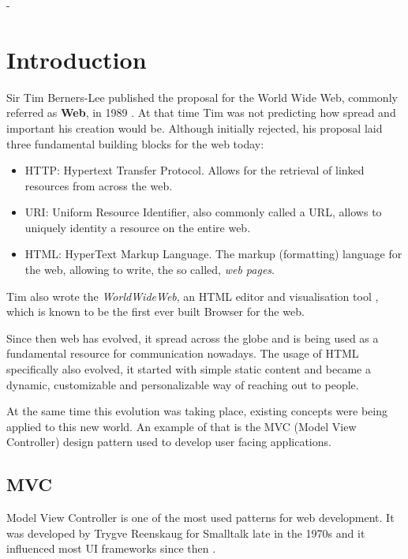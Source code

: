 -\chapter{Introduction}

Sir Tim Berners-Lee published the proposal for the World Wide Web, commonly referred as \textbf{Web}, in 1989 \cite{Berners-Lee1989InformationProposal}. At that time Tim was not predicting how spread and important his creation would be. Although initially rejected, his proposal laid three fundamental building blocks for the web today:

\begin{itemize}
    \item HTTP: Hypertext Transfer Protocol. Allows for the retrieval of linked resources from across the web.
    \item URI: Uniform Resource Identifier, also commonly called a URL, allows to uniquely identity a resource on the entire web.
    \item HTML: HyperText Markup Language. The markup (formatting) language for the web, allowing to write, the so called, \textit{web pages}.
\end{itemize}

Tim also wrote the \textit{WorldWideWeb}, an HTML editor and visualisation tool \cite{Gillies2000HowWeb}, which is known to be the first ever built Browser for the web.

Since then web has evolved, it spread across the globe and is being used as a fundamental resource for communication nowadays. The usage of HTML specifically also evolved, it started with simple static content and became a dynamic, customizable and personalizable way of reaching out to people.

At the same time this evolution was taking place, existing concepts were being applied to this new world. An example of that is the MVC (Model View Controller) design pattern used to develop user facing applications.

\section{MVC}

Model View Controller is one of the most used patterns for web development. It was developed by Trygve Reenskaug for Smalltalk late in the 1970s \cite{Reenskaug1979THING-MODEL-VIEW-EDITORPlanningsystem} and it influenced most UI frameworks since then \cite{Fowler2003PatternsArchitecture}.

